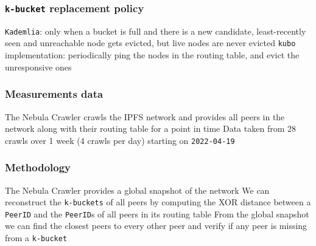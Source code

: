 \documentclass{pl-slide}
\begin{document}
\begin{frame}
\frametitle{\texttt{k-bucket} replacement policy}
\begin{itemize}
    \itemc \texttt{Kademlia}: only when a bucket is full and there is a new candidate, least-recently seen and unreachable node gets evicted, but live nodes are never evicted
	\bigskip    
    \itemc \texttt{kubo} implementation: periodically ping the nodes in the routing table, and evict the unresponsive ones
\end{itemize}
\end{frame}

\begin{frame}
\frametitle{Measurements data}
\begin{itemize}
    \itemc The Nebula Crawler crawls the IPFS network and provides all peers in the network along with their routing table for a point in time
    \itemc Data taken from 28 crawls over 1 week (4 crawls per day) starting on \texttt{2022-04-19}
\end{itemize}
\end{frame}

\begin{frame}
\frametitle{Methodology}
\begin{itemize}
	\itemc The Nebula Crawler provides a global snapshot of the network
	\itemc We can reconstruct the \texttt{k-buckets} of all peers by computing the XOR distance between a \texttt{PeerID} and the \texttt{PeerID}s of all peers in its routing table
	\itemc From the global snapshot we can find the closest peers to every other peer and verify if any peer is missing from a \texttt{k-bucket}
\end{itemize}
\end{frame}
\end{document}
